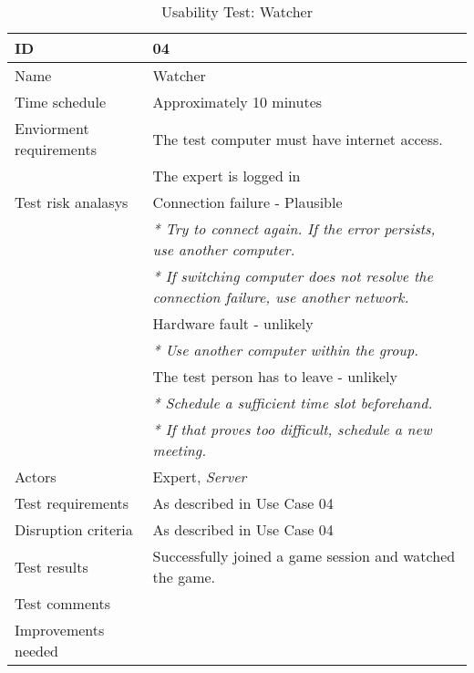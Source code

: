 {\footnotesize
\begin{table}[H]
\begin{tabular}{| p{5cm} | p{10cm} |}\hline
	\textbf{ID}	& \textbf{04} \\ \hline
	Name		& Watcher \\ \hline
	Time schedule	& Approximately 10 minutes\\ \hline
	Enviorment requirements 
		& The test computer must have internet access. \\ 
		& The expert is logged in\\ \hline
	Test risk analasys 
		& Connection failure - Plausible \\
		& \emph{* Try to connect again. If the error persists, use another computer.} \\
		& \emph{* If switching computer does not resolve the connection failure, use another network.}\\
		& Hardware fault - unlikely \\
		& \emph{* Use another computer within the group.} \\
		& The test person has to leave - unlikely \\
		& \emph{* Schedule a sufficient time slot beforehand.} \\
		& \emph{* If that proves too difficult, schedule a new meeting.}\\ \hline
	Actors	& Expert, \emph{Server}\\ \hline
	Test requirements & As described in Use Case 04 \\ \hline
	Disruption criteria & As described in Use Case 04  \\ \hline
	Test results & Successfully joined a game session and watched the game. \\ \hline
	Test comments & \\ \hline
	Improvements needed & \\ \hline
\end{tabular}


\caption{Usability Test: Watcher}
\label{fig:usability_test_4}
\end{table}}



